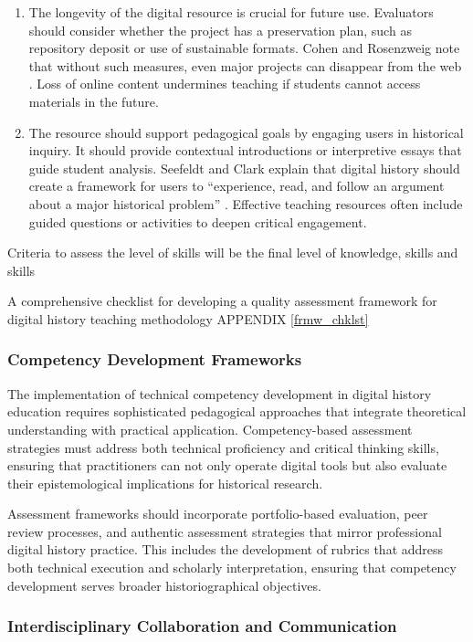 \begin{enumerate}
\item The longevity of the digital resource is crucial for future use. Evaluators should consider whether the project has a preservation plan, such as repository deposit or use of sustainable formats. Cohen and Rosenzweig note that without such measures, even major projects can disappear from the web \cite{CohenRosenzweig2006}. Loss of online content undermines teaching if students cannot access materials in the future.
\item The resource should support pedagogical goals by engaging users in historical inquiry. It should provide contextual introductions or interpretive essays that guide student analysis. Seefeldt and Clark explain that digital history should create a framework for users to ``experience, read, and follow an argument about a major historical problem'' \cite{SeefeldtClark2009}. Effective teaching resources often include guided questions or activities to deepen critical engagement.
\end{enumerate}

Criteria to assess the level of skills will be the final level of knowledge, skills and skills

A comprehensive checklist for developing a quality assessment framework for digital history teaching methodology APPENDIX \ref{frmw_chklst}
 
 \subsubsection{Competency Development Frameworks}

The implementation of technical competency development in digital history education requires sophisticated pedagogical approaches that integrate theoretical understanding with practical application. Competency-based assessment strategies must address both technical proficiency and critical thinking skills, ensuring that practitioners can not only operate digital tools but also evaluate their epistemological implications for historical research.

Assessment frameworks should incorporate portfolio-based evaluation, peer review processes, and authentic assessment strategies that mirror professional digital history practice. This includes the development of rubrics that address both technical execution and scholarly interpretation, ensuring that competency development serves broader historiographical objectives.

\subsubsection{Interdisciplinary Collaboration and Communication} 

